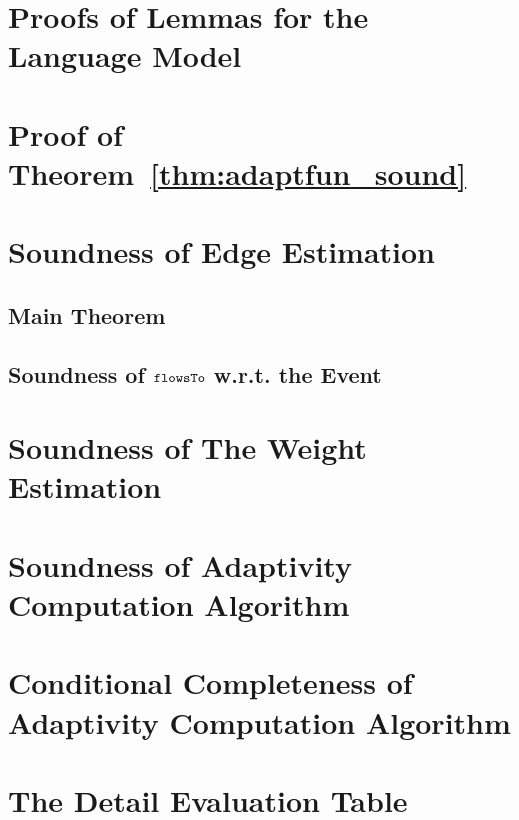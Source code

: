 \section{Proofs of Lemmas for the Language Model}
\label{apdx:lemma_sec123}

\section{Proof of Theorem~\ref{thm:adaptfun_sound}}
\label{apdx:adapt_soundness}

\clearpage
\section{Soundness of Edge Estimation}
\label{apdx:flowsto_soundness}
\subsection{Main Theorem}

%
\subsection{Soundness of $\mathtt{flowsTo}$ w.r.t. the Event}
\label{apdx:flowsto_event_soundness}

\clearpage
\section{Soundness of The Weight Estimation}
\label{apdx:reachability_soundness}

\clearpage
\section{Soundness of Adaptivity Computation Algorithm}
\label{apdx:adaptalg_soundness}

\section{Conditional Completeness of Adaptivity Computation Algorithm}
\label{apdx:adaptalg_completeness}


\section{The Detail Evaluation Table}
\label{apdx:eval_table}

